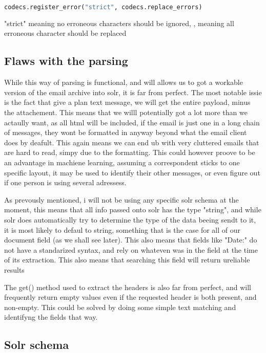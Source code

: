 \documentclass{report}
\begin{document}
\begin{lstlisting}[language=Python]
	codecs.register_error("strict", codecs.replace_errors)
\end{lstlisting}

"strict" meaning no erroneous characters should be ignored, , meaning all erroneous character should be replaced


\subsection{Flaws with the parsing}
While this way of parsing is functional, and will allows us to got a workable version of the email archive into solr, it is far from perfect. The most notable issie is the fact that give a plan text message, we will get the entire payload, minus the attachement. This means that
we willl potentially got a lot more than we actaully want, as all html will be included, if the email is just one in a long chain of messages, they wont be formatted in anyway beyond what the email client does by deafult. This again means we can end ub with very cluttered emails that are hard to read, simpy due to the formatting.
This could however proove to be an advantage in machiene learning, assuming a correspondent sticks to one specific layout, it may be used to identify their other messages, or even figure out if one person is using several adressess.

As prevously mentioned, i will not be using any specific solr schema at the moment, this means that all info passed onto solr has the type "string", and while solr does automatically try to determine the type of the data beeing sendt to it, it is most likely to defaul to string, something that is the case for all 
of our document field (as we shall see later). This also means that fields like "Date:" do not have a standarized syntax, and rely on whateven was in the field at the time of its extraction. This also means that searching this field will return ureliable results

The get() method used to extract the headers is also far from perfect, and will frequently return empty values even if the requested header is both present, and non-empty.
This could be solved by doing some simple text matching and identifyng the fields that way.


\subsection{Solr schema}
\end{document}

